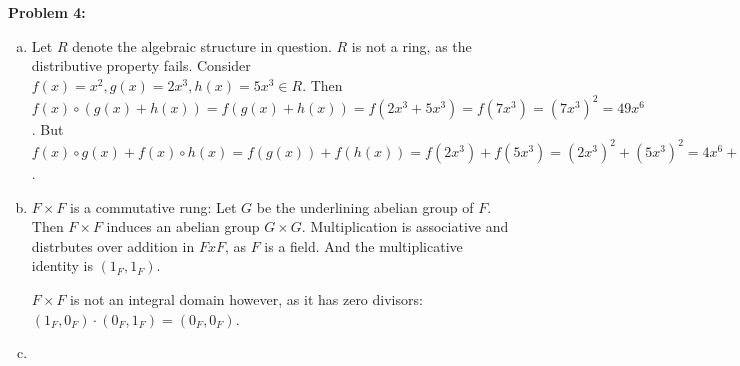 \documentclass[12pt, letterpaper]{article}
\newenvironment{problem}
    [1]
    {\noindent \textbf{Problem #1:}}
    {\vspace{3mm}}
\begin{document}
\begin{problem}{4}
    \begin{enumerate}[(a)]
        \item Let $R$ denote the algebraic structure in question. $R$ is not a ring, as the
        distributive property fails. Consider $f(x) = x^2, g(x) = 2x^3, h(x) = 5x^3 \in R$.
        Then $f(x) \circ (g(x) + h(x)) = f(g(x) + h(x)) = f(2x^3 + 5x^3) = f(7x^3) = 
        (7x^3)^2 = 49x^6$. But $f(x) \circ g(x) + f(x) \circ h(x) = f(g(x)) + f(h(x)) = 
        f(2x^3) + f(5x^3) = (2x^3)^2 + (5x^3)^2 = 4x^6 + 25x^6 = 29x^6$.

        \item  $F \times F$ is a commutative rung: Let $G$ be the underlining abelian group of 
        $F$. Then $F \times F$ induces an abelian group $G \times G$. Multiplication is associative
        and distrbutes over addition in $F x F$, as $F$ is a field. And the multiplicative identity
        is $(1_F, 1_F)$.

        \bigskip\noindent
        $F \times F$ is not an integral domain however, as it has zero divisors: $(1_F, 0_F) \cdot
        (0_F, 1_F) = (0_F, 0_F)$.
        
        \item 
    \end{enumerate}
\end{problem}
\end{document}
